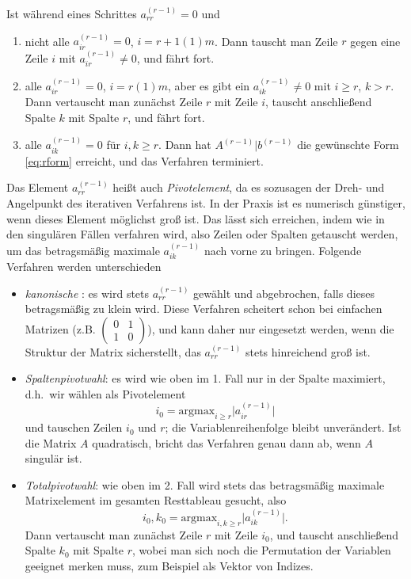 Ist während eines Schrittes $a_{rr}^{(r-1)} = 0$ und
\begin{enumerate}
\item nicht alle $a_{ir}^{(r-1)}=0$, $i=r+1(1)m$. Dann tauscht man
  Zeile $r$ gegen eine Zeile $i$ mit $a_{ir}^{(r-1)}\neq 0$, und fährt
  fort.
\item alle $a_{ir}^{(r-1)}=0$, $i=r(1)m$, aber es gibt ein
  $a_{ik}^{(r-1)}\neq 0$ mit $i\ge r$, $k> r$. Dann vertauscht man zunächst
  Zeile $r$ mit Zeile $i$, tauscht anschließend Spalte $k$ mit
  Spalte $r$, und fährt fort.
\item alle $a_{ik}^{(r-1)}=0$ für $i,k \ge r$. Dann hat
  $A^{(r-1)}|b^{(r-1)}$ die gewünschte Form \eqref{eq:rform} erreicht,
  und das Verfahren terminiert.
\end{enumerate}

Das Element $a_{rr}^{(r-1)}$ heißt auch \emph{Pivotelement}, da es
sozusagen der Dreh- und Angelpunkt des iterativen Verfahrens ist.  In
der Praxis ist es numerisch günstiger, wenn dieses Element möglichst
groß ist. Das lässt sich erreichen, indem wie in den singulären
Fällen verfahren wird, also Zeilen oder Spalten getauscht werden, um
das betragsmäßig maximale $a_{ik}^{(r-1)}$ nach vorne zu
bringen. Folgende Verfahren werden unterschieden
\begin{itemize}
\item \emph{kanonische }: es wird stets
  $a_{rr}^{(r-1)}$ gewählt und abgebrochen, falls dieses betragsmäßig
  zu klein wird. Diese Verfahren scheitert schon bei einfachen
  Matrizen (z.B. {\tiny $\begin{pmatrix} 0 & 1\\ 1 &
      0\end{pmatrix}$}), und kann daher nur eingesetzt werden, wenn
  die Struktur der Matrix sicherstellt, das $a_{rr}^{(r-1)}$ stets
  hinreichend groß ist.
\item \emph{Spaltenpivotwahl}: es wird wie oben im 1. Fall nur in der
  Spalte maximiert, d.h.\ wir wählen als  Pivotelement
  \begin{equation}
    i_0 = \text{argmax}_{i\ge r} \lvert a_{ir}^{(r-1)}\rvert
  \end{equation}
  und tauschen Zeilen $i_0$ und $r$; die Variablenreihenfolge bleibt
  unverändert. Ist die Matrix $A$ quadratisch, bricht das Verfahren
  genau dann ab, wenn $A$ singulär ist.
\item \emph{Totalpivotwahl}: wie oben im 2. Fall wird stets das
  betragsmäßig maximale
  Matrixelement im gesamten Resttableau gesucht, also
  \begin{equation}
    i_0,k_0 = \text{argmax}_{i,k\ge r} \lvert a_{ik}^{(r-1)}\rvert.
  \end{equation}
  Dann vertauscht man zunächst Zeile $r$ mit Zeile $i_0$, und tauscht
  anschließend Spalte $k_0$ mit Spalte $r$, wobei man sich noch die
  Permutation der Variablen geeignet merken muss, zum Beispiel als
  Vektor von Indizes.
\end{itemize}

